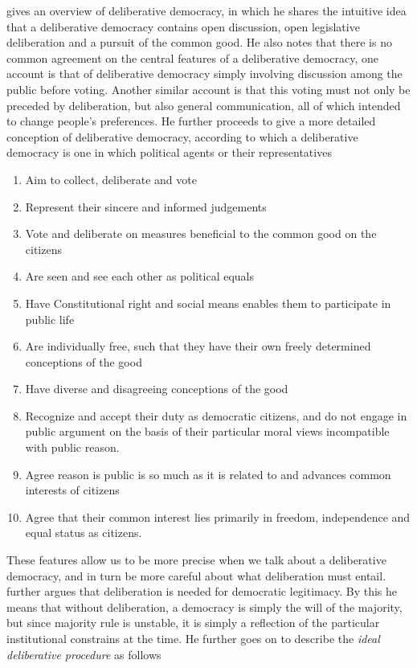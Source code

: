 \citet{freemanDeliberativeDemocracySympathetic2000} gives an overview of deliberative democracy, in which he shares the intuitive idea that a deliberative democracy contains open discussion, open legislative deliberation and a pursuit of the common good. He also notes that there is no common agreement on the central features of a deliberative democracy, one account is that of deliberative democracy simply involving discussion among the public before voting. Another similar account is that this voting must not only be preceded by deliberation, but also general communication, all of which intended to change people's preferences. He further proceeds to give a more detailed conception of deliberative democracy, according to which a deliberative democracy is one in which political agents or their representatives

\begin{enumerate}
	\label{list:deliberative-democracy}
	\setlength\itemsep{1px}
	\item  Aim to collect, deliberate and vote
	\item  Represent their sincere and informed judgements
	\item  Vote and deliberate on measures beneficial to the common good on the citizens
	\item  Are seen and see each other as political equals
	\item  Have Constitutional right and social means enables them to participate in public life
	\item  Are individually free, such that they have their own freely determined conceptions of the good
	\item  Have diverse and disagreeing conceptions of the good
	\item  Recognize and accept their duty as democratic citizens, and do not engage in public argument on the basis of their particular moral views incompatible with public reason.
	\item  Agree reason is public is so much as it is related to and advances common interests of citizens
	\item  Agree that their common interest lies primarily in freedom, independence and equal status as citizens.
\end{enumerate}

These features allow us to be more precise when we talk about a deliberative democracy, and in turn be more careful about what deliberation must entail. \citet{cohenDELIBERATIONDEMOCRATICLEGITIMACY2002} further argues that deliberation is needed for democratic legitimacy. By this he means that without deliberation, a democracy is simply the will of the majority, but since majority rule is unstable, it is simply a reflection of the particular institutional constrains at the time. He further goes on to describe the \textit{ideal deliberative procedure} as follows

